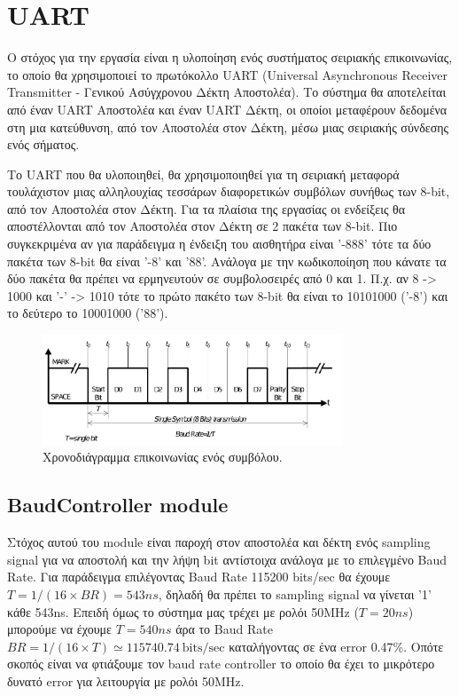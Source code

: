 \documentclass[../main.tex]{subfiles}
\begin{document}
\section{UART}

Ο στόχος για την εργασία είναι η υλοποίηση ενός συστήματος σειριακής
επικοινωνίας, το οποίο θα χρησιμοποιεί το πρωτόκολλο UART (Universal
Asynchronous Receiver Transmitter - Γενικού Ασύγχρονου Δέκτη Αποστολέα). Το
σύστημα θα αποτελείται από έναν UART Αποστολέα και έναν UART Δέκτη, οι οποίοι
μεταφέρουν δεδομένα στη μια κατεύθυνση, από τον Αποστολέα στον Δέκτη, μέσω μιας
σειριακής σύνδεσης ενός σήματος.

Το UART που θα υλοποιηθεί, θα χρησιμοποιηθεί για τη σειριακή μεταφορά
τουλάχιστον μιας αλληλουχίας τεσσάρων διαφορετικών συμβόλων συνήθως των 8-bit,
από τον Αποστολέα στον Δέκτη. Για τα πλαίσια της εργασίας οι ενδείξεις θα
αποστέλλονται από τον Αποστολέα στον Δέκτη σε 2 πακέτα των 8-bit. Πιο
συγκεκριμένα αν για παράδειγμα η ένδειξη του αισθητήρα είναι '-888' τότε τα δύο
πακέτα των 8-bit θα είναι '-8' και '88'. Ανάλογα με την κωδικοποίηση που κάνατε
τα δύο πακέτα θα πρέπει να ερμηνευτούν σε συμβολοσειρές από 0 και 1. Π.χ. αν 8
-> 1000 και '-' -> 1010 τότε το πρώτο πακέτο των 8-bit θα είναι το 10101000
('-8') και το δεύτερο το 10001000 ('88').

\begin{figure}[H]
  \begin{center}
    \includegraphics[width=0.8\textwidth]{../images/example_uart_signal.png}
  \end{center}
  \caption{Χρονοδιάγραμμα επικοινωνίας ενός συμβόλου.}
  \label{fig:uart_example}
\end{figure}


\subsection{BaudController module}

Στόχος αυτού του module είναι παροχή στον αποστολέα και δέκτη ενός sampling
signal για να αποστολή και την λήψη bit αντίστοιχα ανάλογα με το επιλεγμένο Baud
Rate. Για παράδειγμα επιλέγοντας Baud Rate 115200 bits/sec θα έχουμε
$T=1/(16\times BR) = 543ns$, δηλαδή θα πρέπει το sampling signal να γίνεται '1'
κάθε 543ns. Επειδή όμως το σύστημα μας τρέχει με ρολόι 50MHz ($T=20ns$) μπορούμε
να έχουμε $T=540ns$ άρα το Baud Rate $BR = 1/(16\times T) \simeq
115740.74~\mathrm{bits/sec}$ καταλήγοντας σε ένα error 0.47\%. Οπότε σκοπός
είναι να φτιάξουμε τον baud rate controller το οποίο θα έχει το μικρότερο
δυνατό error για λειτουργία με ρολόι 50MHz.
\end{document}
